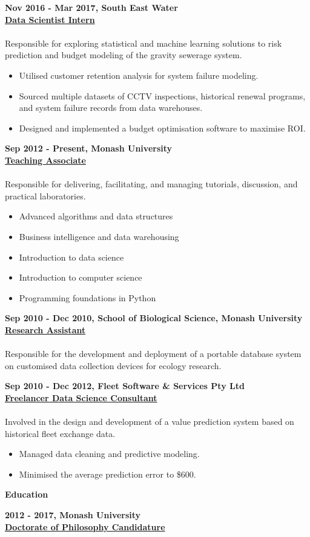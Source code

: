 \documentclass[a4paper,8pt,final]{memoir}
\newcommand{\Sep}{\vspace{1.5em}}
\newcommand{\SmallSep}{\vspace{0.5em}}
\newcommand{\CVSection}[1]
	{\Large\textbf{#1}\par
	\SmallSep\normalsize\normalfont}
\newcommand{\CVItem}[1]
	{\textbf{\color{RoyalBlue} #1}}
\begin{document}
\CVItem{Nov 2016 - Mar 2017, South East Water}\\
\underline{\textbf{Data Scientist Intern}}\\
\\
Responsible for exploring statistical and machine learning solutions to risk prediction and budget modeling of the gravity sewerage system.
    \begin{itemize}
        \item Utilised customer retention analysis for system failure modeling.
        \item Sourced multiple datasets of CCTV inspections, historical renewal programs, and system failure records from data warehouses.
        \item Designed and implemented a budget optimisation software to maximise ROI.
    \end{itemize}
\Sep

\clearpage
\framebreak
\framebreak

\CVItem{Sep 2012 - Present, Monash University}\\
\underline{\textbf{Teaching Associate}}\\
\\
Responsible for delivering, facilitating, and managing tutorials, discussion, and practical laboratories.
    \begin{itemize}
        \item Advanced algorithms and data structures
        \item Business intelligence and data warehousing
        \item Introduction to data science
        \item Introduction to computer science
        \item Programming foundations in Python
    \end{itemize}
\Sep

\CVItem{Sep 2010 - Dec 2010, School of Biological Science, Monash University}\\
\underline{\textbf{Research Assistant}}\\
\\
Responsible for the development and deployment of a portable database system on customised data collection devices for ecology research.
\Sep

\CVItem{Sep 2010 - Dec 2012, Fleet Software \& Services Pty Ltd}\\
\underline{\textbf{Freelancer Data Science Consultant}}\\
\\
Involved in the design and development of a value prediction system based on historical fleet exchange data.
    \begin{itemize}
        \item Managed data cleaning and predictive modeling.
        \item Minimised the average prediction error to \$600.
    \end{itemize}
\Sep
\Sep
\Sep
\CVSection{Education}
\CVItem{2012 - 2017, Monash University}\\
\underline{\textbf{Doctorate of Philosophy Candidature}}
\Sep
\end{document}

